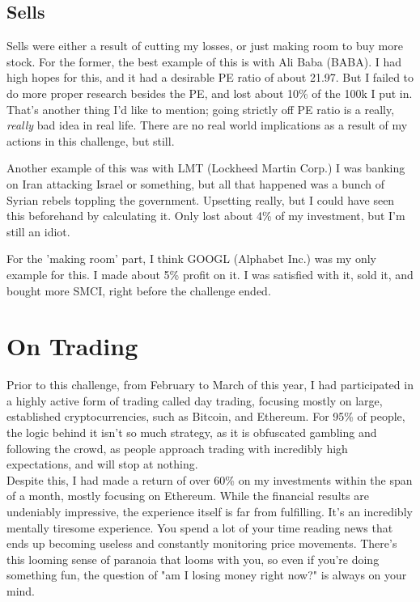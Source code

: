 \documentclass[a4paper, 12pt]{article}
\begin{document}
\subsection*{Sells}
Sells were either a result of cutting my losses, or just making room to buy more
stock. For the former, the best example of this is with Ali Baba (BABA). I had
high hopes for this, and it had a desirable PE ratio of about 21.97. But I
failed to do more proper research besides the PE, and lost about 10\% of the
100k I put in. \\

That's another thing I'd like to mention; going strictly off PE ratio is a
really, \textit{really} bad idea in real life. There are no real world
implications as a result of my actions in this challenge, but still.

Another example of this was with LMT (Lockheed Martin Corp.) I was
banking on Iran attacking Israel or something, but all that happened was a
bunch of Syrian rebels toppling the government. Upsetting really, but 
I could have seen this beforehand by calculating it. Only lost about 4\%
of my investment, but I'm still an idiot.

For the 'making room' part, I think GOOGL (Alphabet Inc.) was my only example
for this. I made about 5\% profit on it. I was satisfied with it, sold it, and 
bought more SMCI, right before the challenge ended.

\section{On Trading}

Prior to this challenge, from February to March of this year, 
I had participated in a highly active form of trading called day trading, 
focusing mostly on large, established cryptocurrencies, such as Bitcoin, 
and Ethereum. For 95\% of people, the logic behind it isn't so much strategy, 
as it is obfuscated gambling and following the crowd, as people approach
trading with incredibly high expectations, and will stop at nothing. \\

Despite this, I had made a return of over 60\% on my investments within the
span of a month, mostly focusing on Ethereum. While the financial results are
undeniably impressive, the experience itself is far from fulfilling. It's 
an incredibly mentally tiresome experience. You spend a lot of your time reading
news that ends up becoming useless and constantly monitoring price movements.
There's this looming sense of paranoia that looms with you, so even if you're doing
something fun, the question of "am I losing money right now?" is always on your mind. \\
\end{document}
